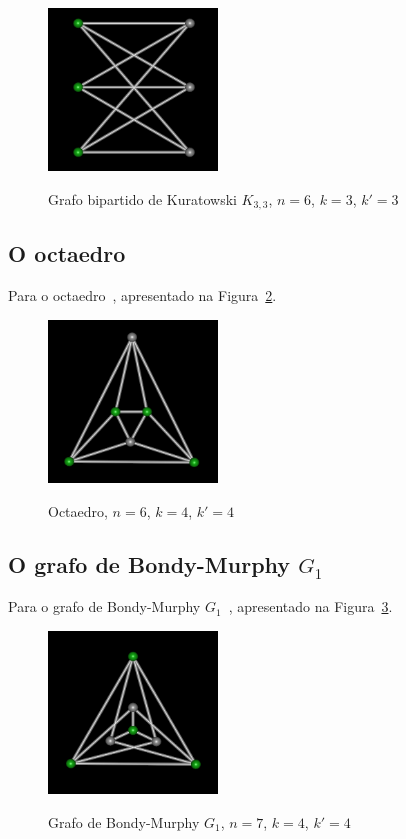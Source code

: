\begin{figure}[htb]
\centering
\includegraphics[width=0.4\textwidth]{img/kuratowski.png}
\label{fig:example-kuratowski}
\caption{Grafo bipartido de Kuratowski $K_{3,3}$, $n=6$, $k=3$, $k'=3$}
\end{figure}


\subsection{O octaedro}
Para o octaedro~\cite{cite:example-plato},
apresentado na Figura~\ref{fig:example-octaedro}.

\begin{figure}[htb]
\centering
\includegraphics[width=0.4\textwidth]{img/octaedro.png}
\label{fig:example-octaedro}
\caption{Octaedro, $n=6$, $k=4$, $k'=4$}
\end{figure}


\subsection{O grafo de Bondy-Murphy $G_1$}
Para o grafo de Bondy-Murphy $G_1$~\cite{cite:example-bondy},
apresentado na Figura~\ref{fig:example-bondymurphyg1}.

\begin{figure}[htb]
\centering
\includegraphics[width=0.4\textwidth]{img/bondymurphyg1.png}
\label{fig:example-bondymurphyg1}
\caption{Grafo de Bondy-Murphy $G_1$, $n=7$, $k=4$, $k'=4$}
\end{figure}


